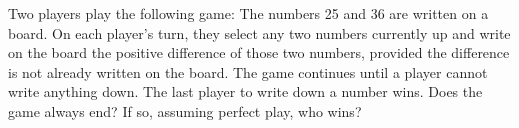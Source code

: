 \documentclass[10pt,twoside]{amsart}
\begin{document}
\begin{exercises}
\item Two players play the following game: The numbers 25 and 36 are written
on a board. On each player's turn, they select any two numbers currently
up and write on the board the positive difference of those two numbers,
provided the difference is not already written on the board. The game
continues until a player cannot write anything down. The last player to
write down a number wins. Does the game always end? If so, assuming
perfect play, who wins?



\end{exercises}
\end{document}
